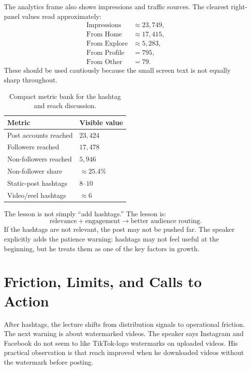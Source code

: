 The analytics frame also shows impressions and traffic sources. The clearest right-panel values read approximately:
\begin{align}
\text{Impressions} &\approx 23{,}749,\\
\text{From Home} &\approx 17{,}415,\\
\text{From Explore} &\approx 5{,}283,\\
\text{From Profile} &= 795,\\
\text{From Other} &= 79.
\end{align}
These should be used cautiously because the small screen text is not equally sharp throughout.

\begin{table}
\centering
\begin{tabular}{ll}
\hline
Metric & Visible value \\
\hline
Post accounts reached & $23{,}424$ \\
Followers reached & $17{,}478$ \\
Non-followers reached & $5{,}946$ \\
Non-follower share & $\approx 25.4\%$ \\
Static-post hashtags & $8\text{--}10$ \\
Video/reel hashtags & $\approx 6$ \\
\hline
\end{tabular}
\caption{Compact metric bank for the hashtag and reach discussion.}
\end{table}

The lesson is not simply ``add hashtags.'' The lesson is:
\begin{equation}
\text{relevance} + \text{engagement}
\longrightarrow
\text{better audience routing}.
\end{equation}
If the hashtags are not relevant, the post may not be pushed far. The speaker explicitly adds the patience warning: hashtags may not feel useful at the beginning, but he treats them as one of the key factors in growth.

\section{Friction, Limits, and Calls to Action}

After hashtags, the lecture shifts from distribution signals to operational friction. The next warning is about watermarked videos. The speaker says Instagram and Facebook do not seem to like TikTok-logo watermarks on uploaded videos. His practical observation is that reach improved when he downloaded videos without the watermark before posting.

